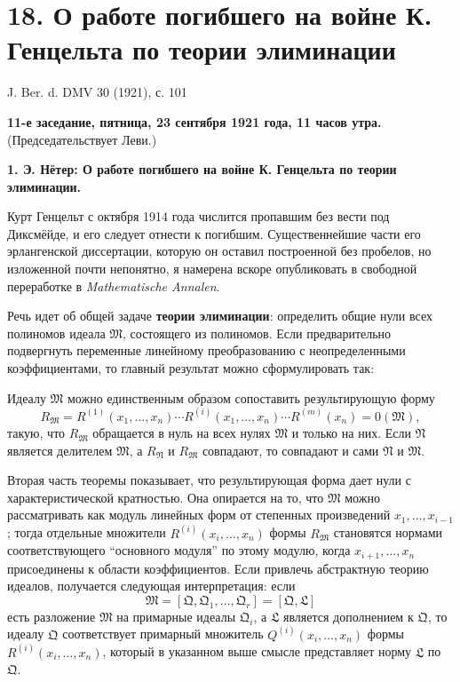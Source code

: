 \documentclass[11pt]{article}
\begin{document}

\setcounter{footnote}{0}
\section*{18. О работе погибшего на войне К. Генцельта по теории элиминации}
\begin{center}
J. Ber. d. DMV 30 (1921), с. 101
\end{center}

\begin{center}
\textbf{11-е заседание, пятница, 23 сентября 1921 года, 11 часов утра.}\\
(Председательствует Леви.)
\end{center}

\textbf{1. Э. Нётер: О работе погибшего на войне К. Генцельта по теории элиминации.}

Курт Генцельт с октября 1914 года числится пропавшим без вести под Диксмёйде, и его следует отнести к погибшим. Существеннейшие части его эрлангенской диссертации, которую он оставил построенной без пробелов, но изложенной почти непонятно, я намерена вскоре опубликовать в свободной переработке в \emph{Mathematische Annalen}.

Речь идет об общей задаче \textbf{теории элиминации}: определить общие нули всех полиномов идеала \(\mathfrak M\), состоящего из полиномов. Если предварительно подвергнуть переменные линейному преобразованию с неопределенными коэффициентами, то главный результат можно сформулировать так:

Идеалу \(\mathfrak M\) можно единственным образом сопоставить результирующую форму
\[
 R_{\mathfrak M}=R^{(1)}(x_1,
\ldots,x_n)\cdots R^{(i)}(x_1,
\ldots,x_n)\cdots R^{(m)}(x_n)=0(\mathfrak M),
\]
такую, что \(R_{\mathfrak M}\) обращается в нуль на всех нулях \(\mathfrak M\) и только на них. Если \(\mathfrak N\) является делителем \(\mathfrak M\), а \(R_{\mathfrak N}\) и \(R_{\mathfrak M}\) совпадают, то совпадают и сами \(\mathfrak N\) и \(\mathfrak M\).

Вторая часть теоремы показывает, что результирующая форма дает нули с характеристической кратностью. Она опирается на то, что \(\mathfrak M\) можно рассматривать как модуль линейных форм от степенных произведений \(x_1,
\ldots,x_{i-1}\); тогда отдельные множители \(R^{(i)}(x_i,
\ldots,x_n)\) формы \(R_{\mathfrak M}\) становятся нормами соответствующего ``основного модуля'' по этому модулю, когда \(x_{i+1},
\ldots,x_n\) присоединены к области коэффициентов. Если привлечь абстрактную теорию идеалов, получается следующая интерпретация: если
\[
 \mathfrak M=[\mathfrak Q,\mathfrak Q_1,
\ldots,
\mathfrak Q_r]=[\mathfrak Q,\mathfrak L]
\]
есть разложение \(\mathfrak M\) на примарные идеалы \(\mathfrak Q_i\), а \(\mathfrak L\) является дополнением к \(\mathfrak Q\), то идеалу \(\mathfrak Q\) соответствует примарный множитель \(Q^{(i)}(x_i,
\ldots,x_n)\) формы \(R^{(i)}(x_i,
\ldots,x_n)\), который в указанном выше смысле представляет норму \(\mathfrak L\) по \(\mathfrak Q\).

\clearpage
\end{document}
